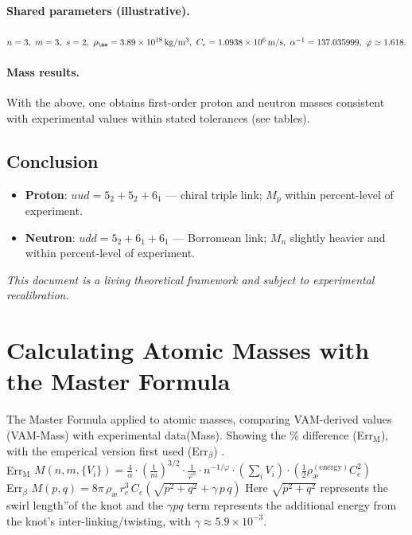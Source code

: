 \documentclass[12pt]{article}
\begin{document}
  \paragraph{Shared parameters (illustrative).}
  \(n=3,\ m=3,\ s=2,\ \rho_{\ae}=3.89\times10^{18}\,\mathrm{kg/m^3},\
  C_e=1.0938\times10^{6}\,\mathrm{m/s},\
  \alpha^{-1}=137.035999,\ \varphi\simeq1.618.\)

  \paragraph{Mass results.}
  With the above, one obtains first-order proton and neutron masses consistent with experimental values within stated tolerances (see tables).

  \subsection{Conclusion}
  \begin{itemize}
      \item \textbf{Proton}: \(uud=5_2+5_2+6_1\) — chiral triple link; \(M_p\) within percent-level of experiment.
      \item \textbf{Neutron}: \(udd=5_2+6_1+6_1\) — Borromean link; \(M_n\) slightly heavier and within percent-level of experiment.
  \end{itemize}

\textit{This document is a living theoretical framework and subject to experimental recalibration.}

  
  

\appendix
      \section{Calculating Atomic Masses with the Master Formula}\label{sec:AtomicMasses}
  The Master Formula applied to atomic masses, comparing VAM-derived values (VAM-Mass) with experimental data(Mass). Showing the \% difference (Err$_\text{M}$), with the emperical version first used (Err$_\beta$)  .   \\ Err$_\text{M}$ \( M(n, m, \{V_i\}) = \frac{4}{\alpha} \cdot \left( \frac{1}{m} \right)^{3/2} \cdot \frac{1}{\varphi^s} \cdot n^{-1/\varphi} \cdot \left( \sum_i V_i \right) \cdot \left( \frac{1}{2} \rho_\text{\ae}^{(\text{energy})} C_e^2 \right) \)\\
  Err$_\beta$ \(  M(p,q) = 8\pi\,\rho_{\text{\ae}}\,r_c^3\,C_e \left(\sqrt{p^2 + q^2} + \gamma\, p\,q\right) \)
  Here $\sqrt{p^2+q^2}$ represents the \grqq swirl length\textquotedblright of the knot and the $\gamma p q$ term represents the additional energy from the knot's inter-linking/twisting, with $\gamma \approx 5.9\times10^{-3}$.
\end{document}

